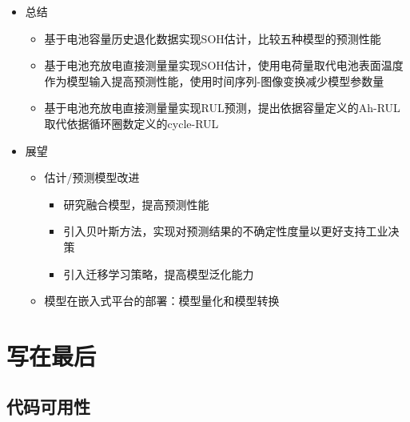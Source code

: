 \documentclass{beamer}
\begin{document}
\begin{frame}
	\begin{itemize}
		\item 总结
		      \begin{itemize}
			      \item 基于电池容量历史退化数据实现SOH估计，比较五种模型的预测性能
			      \item 基于电池充放电直接测量量实现SOH估计，使用电荷量取代电池表面温度作为模型输入提高预测性能，使用时间序列-图像变换减少模型参数量
			      \item 基于电池充放电直接测量量实现RUL预测，提出依据容量定义的Ah-RUL取代依据循环圈数定义的cycle-RUL
		      \end{itemize}
		\item 展望
		      \begin{itemize}
			      \item 估计/预测模型改进
			            \begin{itemize}
				            \item 研究融合模型，提高预测性能
				            \item 引入贝叶斯方法，实现对预测结果的不确定性度量以更好支持工业决策
				            \item 引入迁移学习策略，提高模型泛化能力
			            \end{itemize}
			      \item 模型在嵌入式平台的部署：模型量化和模型转换
		      \end{itemize}
	\end{itemize}
\end{frame}

\section{写在最后}

\subsection{代码可用性}
\end{document}
